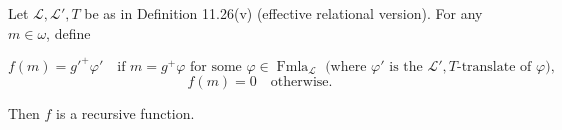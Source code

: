 Let $\mathcal{L}, \mathcal{L}', T$ be as in Definition 11.26(v) (effective relational version). For any $m \in \omega$, define

$$f(m) = g'^+\varphi' \quad\text{if } m = g^+\varphi \text{ for some } \varphi \in \operatorname{Fmla}_{\mathcal{L}} \text{ (where } \varphi' \text{ is the } \mathcal{L}',T\text{-translate of } \varphi),$$
$$f(m) = 0 \quad\text{otherwise.}$$

Then $f$ is a recursive function.

